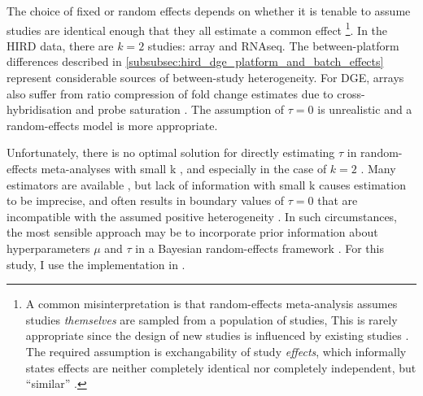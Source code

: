 The choice of fixed or random effects depends on whether it is tenable to assume studies are identical enough that they all estimate a common effect%
\footnote{
    A common misinterpretation is that random-effects meta-analysis assumes studies \textit{themselves} are sampled from a population of studies,
    This is rarely appropriate since the design of new studies is influenced by existing studies \autocite{higgins2009ReevaluationRandomeffectsMetaanalysis}.
    The required assumption is exchangability of study \textit{effects}, which informally states
    effects are neither completely identical nor completely independent, but \enquote{similar} \autocite{higgins2009ReevaluationRandomeffectsMetaanalysis}.
}.
In the \gls{HIRD} data, there are $k=2$ studies: array and \gls{RNAseq}.
The between-platform differences described in \cref{subsubsec:hird_dge_platform_and_batch_effects} represent considerable sources of between-study heterogeneity.
For \gls{DGE}, arrays also suffer from ratio compression of fold change estimates due to cross-hybridisation and probe saturation \autocite{yuen2002AccuracyCalibrationCommercial,draghici2006ReliabilityReproducibilityIssues,ma2017JointBayesianModel}.
The assumption of $\tau=0$ is unrealistic and a random-effects model is more appropriate.

Unfortunately, there is no optimal solution for directly estimating $\tau$ in random-effects meta-analyses with small k \autocite{bender2018MethodsEvidenceSynthesis}, and especially in the case of $k=2$ \autocite{gonnermann2015NoSolutionCombining}.
Many estimators are available \autocite{veroniki2016MethodsEstimateBetweenstudy}, but lack of information with small k causes estimation to be imprecise, and often results in boundary values of $\tau = 0$ that are incompatible with the assumed positive heterogeneity \autocite{chung2013NondegeneratePenalizedLikelihood,friede2017MetaanalysisFewSmall}.
In such circumstances, the most sensible approach may be to incorporate prior information about hyperparameters $\mu$ and $\tau$ in a Bayesian random-effects framework \autocite{chung2013NondegeneratePenalizedLikelihood,veroniki2016MethodsEstimateBetweenstudy,friede2017MetaanalysisFewSmall,seide2019LikelihoodbasedRandomeffectsMetaanalysis}.
For this study, I use the implementation in  \autocite{rover2017BayesianRandomeffectsMetaanalysis}.

